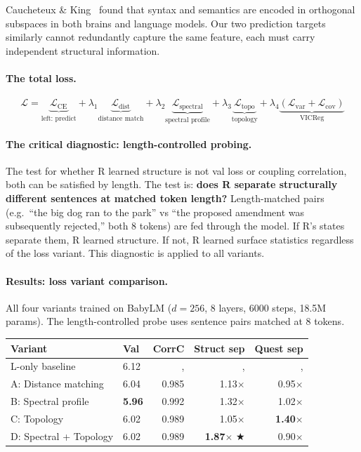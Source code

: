 \documentclass[11pt, a4paper]{article}
\theoremstyle{plain}
\theoremstyle{definition}
\theoremstyle{remark}
\begin{document}
Caucheteux \& King~\cite{caucheteux2021syntax} found that syntax and semantics are encoded in orthogonal subspaces in both brains and language models.
Our two prediction targets similarly cannot redundantly capture the same feature, each must carry independent structural information.

\paragraph{The total loss.}
\begin{equation}
\mathcal{L} = \underbrace{\mathcal{L}_{\mathrm{CE}}}_{\text{left: predict}} + \lambda_1 \underbrace{\mathcal{L}_{\mathrm{dist}}}_{\text{distance match}} + \lambda_2 \underbrace{\mathcal{L}_{\mathrm{spectral}}}_{\text{spectral profile}} + \lambda_3 \underbrace{\mathcal{L}_{\mathrm{topo}}}_{\text{topology}} + \lambda_4 \underbrace{(\mathcal{L}_{\mathrm{var}} + \mathcal{L}_{\mathrm{cov}})}_{\text{VICReg}}
\end{equation}

\paragraph{The critical diagnostic: length-controlled probing.}
The test for whether R learned structure is not val loss or coupling correlation, both can be satisfied by length.
The test is: \textbf{does R separate structurally different sentences at matched token length?}
Length-matched pairs (e.g.\ ``the big dog ran to the park'' vs ``the proposed amendment was subsequently rejected,'' both 8 tokens) are fed through the model.
If R's states separate them, R learned structure.
If not, R learned surface statistics regardless of the loss variant.
This diagnostic is applied to all variants.

\paragraph{Results: loss variant comparison.}
All four variants trained on BabyLM ($d = 256$, 8 layers, 6000 steps, 18.5M params).
The length-controlled probe uses sentence pairs matched at 8 tokens.

\begin{center}\small
\begin{tabular}{llrrr}
\toprule
\textbf{Variant} & \textbf{Val} & \textbf{CorrC} & \textbf{Struct sep} & \textbf{Quest sep} \\
\midrule
L-only baseline & 6.12 & ,  & ,  & ,  \\
A: Distance matching & 6.04 & 0.985 & 1.13$\times$ & 0.95$\times$ \\
B: Spectral profile & \textbf{5.96} & 0.992 & 1.32$\times$ & 1.02$\times$ \\
C: Topology & 6.02 & 0.989 & 1.05$\times$ & \textbf{1.40}$\times$ \\
D: Spectral + Topology & 6.02 & 0.989 & \textbf{1.87}$\times$ ★ & 0.90$\times$ \\
\bottomrule
\end{tabular}
\end{center}
\end{document}

